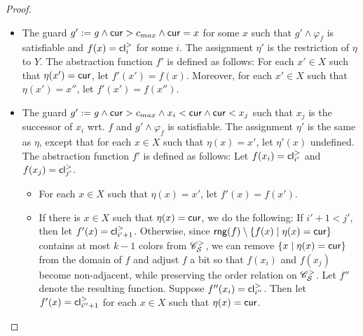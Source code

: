 \begin{appendix}
{\begin{proof}
\begin{itemize}
\begin{itemize}
\begin{itemize}
\item For each $x \in X \setminus \dom(\eta)$, let $f'(x)=f(x)$. 
\end{itemize}
%
\item The guard $g' := g \wedge \mathsf{cur} > c_{max} \wedge \mathsf{cur} = x$ for some $x$ such that $g' \wedge \varphi_f$ is satisfiable and $f(x)=\mathsf{cl}^{>}_i$ for some $i$.  The assignment $\eta'$ is the restriction of  $\eta$ to $Y$. The abstraction function $f'$ is defined as follows: For each $x' \in X$ such that $\eta(x')=\mathsf{cur}$, let $f'(x')=f(x)$. Moreover, for each $x' \in X$ such that $\eta(x')=x''$, let $f'(x')=f(x'')$. 
%
\item The guard $g' := g \wedge \mathsf{cur} > c_{max} \wedge  x_i < \mathsf{cur} \wedge \mathsf{cur} < x_j$ such that $x_j$ is the successor of $x_i$ wrt. $f$ and $g' \wedge \varphi_f$ is satisfiable. The assignment $\eta'$ is the same as $\eta$, except that for each $x \in X$ such that $\eta(x)=x'$, let $\eta'(x)$ undefined.  The abstraction function $f'$ is defined as follows: Let $f(x_i)=\mathsf{cl}^{>}_{i'}$ and $f(x_j)=\mathsf{cl}^{>}_{j'}$. 
\begin{itemize}
\item For each $x \in X$ such that $\eta(x)=x'$, let $f'(x)=f(x')$.
%
\item If there is $x \in X$ such that $\eta(x)=\mathsf{cur}$, we do the following: If $i'+1 < j'$, then let $f'(x)= \mathsf{cl}^{>}_{i'+1}$. Otherwise, since $\mathsf{rng}(f) \setminus \{f(x) \mid \eta(x)=\mathsf{cur}\}$ contains at most $k-1$ colors from $\mathscr{C}^>_{\mathcal{S} }$,  we can remove $\{x \mid \eta(x)=\mathsf{cur}\}$ from the domain of $f$ and adjust $f$ a bit so that $f(x_i)$ and $f(x_j)$ become non-adjacent, while preserving the order relation on $\mathscr{C}^>_{\mathcal{S} }$. Let $f''$ denote the resulting function. Suppose $f''(x_i)=\mathsf{cl}^>_{i''}$. Then let $f'(x)=\mathsf{cl}^>_{i''+1}$ for each $x \in X$ such that $\eta(x)=\mathsf{cur}$.


\end{itemize}
\end{itemize}
\end{itemize}
\end{proof}}
\end{appendix}
